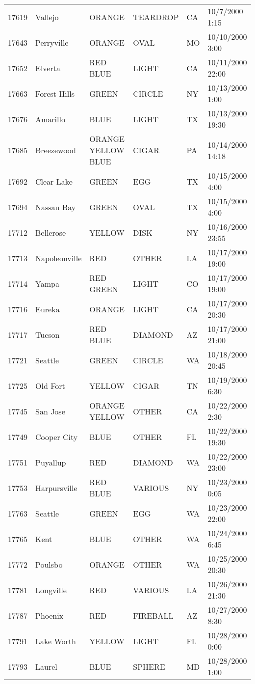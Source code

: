 \begin{tabular}{llllll}
17619 & Vallejo & ORANGE & TEARDROP & CA & 10/7/2000 1:15 \\
17643 & Perryville & ORANGE & OVAL & MO & 10/10/2000 3:00 \\
17652 & Elverta & RED BLUE & LIGHT & CA & 10/11/2000 22:00 \\
17663 & Forest Hills & GREEN & CIRCLE & NY & 10/13/2000 1:00 \\
17676 & Amarillo & BLUE & LIGHT & TX & 10/13/2000 19:30 \\
17685 & Breezewood & ORANGE YELLOW BLUE & CIGAR & PA & 10/14/2000 14:18 \\
17692 & Clear Lake & GREEN & EGG & TX & 10/15/2000 4:00 \\
17694 & Nassau Bay & GREEN & OVAL & TX & 10/15/2000 4:00 \\
17712 & Bellerose & YELLOW & DISK & NY & 10/16/2000 23:55 \\
17713 & Napoleonville & RED & OTHER & LA & 10/17/2000 19:00 \\
17714 & Yampa & RED GREEN & LIGHT & CO & 10/17/2000 19:00 \\
17716 & Eureka & ORANGE & LIGHT & CA & 10/17/2000 20:30 \\
17717 & Tucson & RED BLUE & DIAMOND & AZ & 10/17/2000 21:00 \\
17721 & Seattle & GREEN & CIRCLE & WA & 10/18/2000 20:45 \\
17725 & Old Fort & YELLOW & CIGAR & TN & 10/19/2000 6:30 \\
17745 & San Jose & ORANGE YELLOW & OTHER & CA & 10/22/2000 2:30 \\
17749 & Cooper City & BLUE & OTHER & FL & 10/22/2000 19:30 \\
17751 & Puyallup & RED & DIAMOND & WA & 10/22/2000 23:00 \\
17753 & Harpursville & RED BLUE & VARIOUS & NY & 10/23/2000 0:05 \\
17763 & Seattle & GREEN & EGG & WA & 10/23/2000 22:00 \\
17765 & Kent & BLUE & OTHER & WA & 10/24/2000 6:45 \\
17772 & Poulsbo & ORANGE & OTHER & WA & 10/25/2000 20:30 \\
17781 & Longville & RED & VARIOUS & LA & 10/26/2000 21:30 \\
17787 & Phoenix & RED & FIREBALL & AZ & 10/27/2000 8:30 \\
17791 & Lake Worth & YELLOW & LIGHT & FL & 10/28/2000 0:00 \\
17793 & Laurel & BLUE & SPHERE & MD & 10/28/2000 1:00 \\

\end{tabular}
